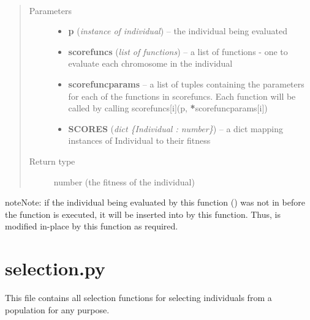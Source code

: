 \documentclass[letterpaper,10pt,english]{sphinxmanual}
\begin{document}
\begin{fulllineitems}
\label{Overview:score}~\begin{quote}\begin{description}
\item[{Parameters}] \leavevmode\begin{itemize}
\item {} 
\textbf{p} (\emph{instance of individual}) -- the individual being evaluated

\item {} 
\textbf{scorefuncs} (\emph{list of functions}) -- a list of functions - one to evaluate each chromosome in the individual

\item {} 
\textbf{scorefuncparams} -- a list of tuples containing the parameters for each of the functions in scorefuncs. Each function will be called by calling scorefuncs{[}i{]}(p, {\color{red}\bfseries{}*}scorefuncparams{[}i{]})

\item {} 
\textbf{SCORES} (\emph{dict \{Individual : number\}}) -- a dict mapping instances of Individual to their fitness

\end{itemize}

\item[{Return type}] \leavevmode
number (the fitness of the individual)

\end{description}\end{quote}

\end{fulllineitems}


\begin{notice}{note}{Note:}
if the individual being evaluated by this function () was not in  before the function is executed, it will be inserted into  by this function. Thus,  is modified in-place by this function as required.
\end{notice}


\section{selection.py}
\label{Overview:selection-py}
This file contains all selection functions for selecting individuals from a population for any purpose.
\end{document}
